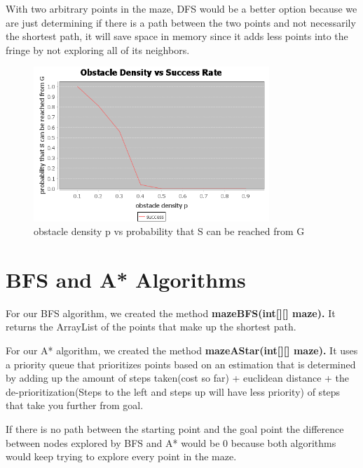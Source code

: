 \documentclass{article}
\begin{document}
	With two arbitrary points in the maze, DFS would be a better option because we are just determining if there is a path between the two points and not necessarily the shortest path, it will save space in memory since it adds less points into the fringe by not exploring all of its neighbors.
	\begin{figure}[hbt!]

\centering
\includegraphics[width=3.5in]{DFSanalysis}

\caption{obstacle density p vs probability that S can be reached from G}
\label{fig:figure2}

\end{figure}

\section{BFS and A* Algorithms}
   For our BFS algorithm, we created the method \textbf{mazeBFS(int[][] maze).} It returns the ArrayList of the points that make up the shortest path.
   
   For our A* algorithm, we created the method \textbf{mazeAStar(int[][] maze).} It uses a priority queue that prioritizes points based on an estimation that is determined by adding up the amount of steps taken(cost so far) + euclidean distance + the de-prioritization(Steps to the left and steps up will have less priority) of steps that take you further from goal.
   
   If there is no path between the starting point and the goal point the difference between nodes explored by BFS and A* would be 0 because both algorithms would keep trying to explore every point in the maze.                                                     
   
\end{document}
